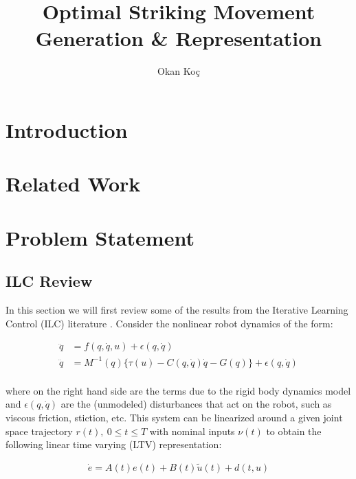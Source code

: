 \documentclass[10pt,a4paper]{article}
\author{Okan Ko\c c}
\title{Optimal Striking Movement Generation \& Representation}
\newcommand{\joint}{q} %
\newcommand{\error}{e} %
\newcommand{\traj}{r} %
\newcommand{\dist}{\epsilon} %
\newcommand{\linDist}{d} %
\newcommand{\sysInput}{u} %
\newcommand{\linInput}{\tilde{u}} %
\newcommand{\dynamics}{f}
\begin{document}
\maketitle

\section{Introduction}

\section{Related Work}

\section{Problem Statement}

\subsection{ILC Review}

In this section we will first review some of the results from the Iterative Learning Control (ILC) literature \cite{Bristow06}. Consider the nonlinear robot dynamics of the form:

\begin{equation}
\begin{aligned}
\ddot{\joint} &= \dynamics(\joint,\dot{\joint},\sysInput) + \dist(\joint,\dot{\joint})\\
\ddot{\joint} &= M^{-1}(\joint)\{ \tau(\sysInput) - C(\joint,\dot{\joint})\dot{\joint} - G(\joint)\} + \dist(\joint,\dot{\joint})\\
\end{aligned}
\label{dynamics}
\end{equation}

where on the right hand side are the terms due to the rigid body dynamics model and $\dist(\joint,\dot{\joint})$ are the (unmodeled) disturbances that act on the robot, such as viscous friction, stiction, etc. This system can be linearized around a given joint space trajectory $\traj(t), \ 0 \leq t \leq T$ with nominal inputs $\nu(t)$ to obtain the following linear time varying (LTV) representation:

\begin{equation}
\begin{aligned}
\dot{\error} = A(t)\error(t) + B(t)\linInput(t) + \linDist(t,\sysInput)
\end{aligned}
\label{LTV}
\end{equation}
\end{document}
